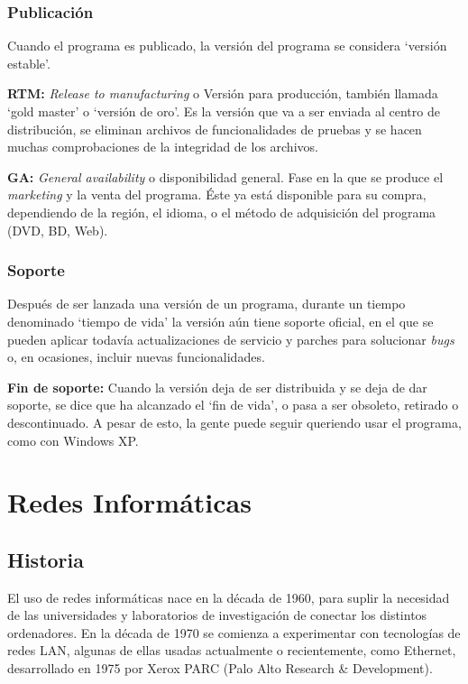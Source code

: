 \documentclass[a4paper, 11pt]{report} %
\begin{document}
\subsection{Publicación}
Cuando el programa es publicado, la versión del programa se considera `versión estable'.
\begin{description}
\item \textbf{RTM:} \textit{Release to manufacturing} o Versión para producción, también llamada `gold master' o `versión de oro'.  Es la versión que va a ser enviada al centro de distribución, se eliminan archivos de funcionalidades de pruebas y se hacen muchas comprobaciones de la integridad de los archivos.
\item \textbf{GA:} \textit{General availability} o disponibilidad general. Fase en la que se produce el \textit{marketing} y la venta del programa. Éste ya está disponible para su compra, dependiendo de la región, el idioma, o el método de adquisición del programa (DVD, BD, Web).
\end{description}
\subsection{Soporte}
Después de ser lanzada una versión de un programa, durante un tiempo denominado `tiempo de vida' la versión aún tiene soporte oficial, en el que se pueden aplicar todavía actualizaciones de servicio y parches para solucionar \textit{bugs} o, en ocasiones, incluir nuevas funcionalidades.
\begin{description}
\item \textbf{Fin de soporte:} Cuando la versión deja de ser distribuida y se deja de dar soporte, se dice que ha alcanzado el `fin de vida', o pasa a ser obsoleto, retirado o descontinuado. A pesar de esto, la gente puede seguir queriendo usar el programa, como con Windows XP.
\end{description}

\chapter{Redes Informáticas}
\section*{Historia}
El uso de redes informáticas nace en la década de 1960, para suplir la necesidad de las universidades y laboratorios de investigación de conectar los distintos ordenadores. En la década de 1970 se comienza a experimentar con tecnologías de redes LAN, algunas de ellas usadas actualmente o recientemente, como Ethernet, desarrollado en 1975 por Xerox PARC (Palo Alto Research \& Development). 
\end{document}
